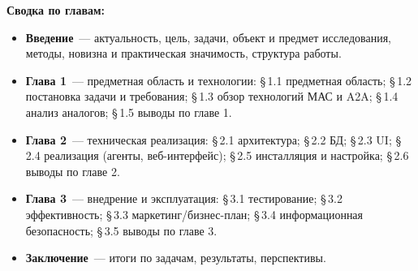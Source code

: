 \documentclass[12pt]{G7-32}
\begin{document}
\textbf{Сводка по главам:}

\begin{itemize}
  \item \textbf{Введение}~--- актуальность, цель, задачи, объект и предмет исследования, методы, новизна и практическая значимость, структура работы.
  \item \textbf{Глава 1}~--- предметная область и технологии: \S\,1.1 предметная область; \S\,1.2 постановка задачи и требования; \S\,1.3 обзор технологий МАС и A2A; \S\,1.4 анализ аналогов; \S\,1.5 выводы по главе 1.
  \item \textbf{Глава 2}~--- техническая реализация: \S\,2.1 архитектура; \S\,2.2 БД; \S\,2.3 UI; \S\,2.4 реализация (агенты, веб-интерфейс); \S\,2.5 инсталляция и настройка; \S\,2.6 выводы по главе 2.
  \item \textbf{Глава 3}~--- внедрение и эксплуатация: \S\,3.1 тестирование; \S\,3.2 эффективность; \S\,3.3 маркетинг/бизнес-план; \S\,3.4 информационная безопасность; \S\,3.5 выводы по главе 3.
  \item \textbf{Заключение}~--- итоги по задачам, результаты, перспективы.
\end{itemize}
\end{document}
